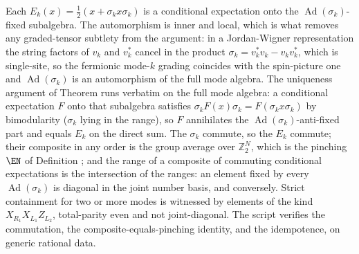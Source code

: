 Each $E_k(x) = \tfrac12(x + \sigma_k x \sigma_k)$ is a conditional expectation onto the $\operatorname{Ad}(\sigma_k)$-fixed subalgebra. The automorphism is inner and local, which is what removes any graded-tensor subtlety from the argument: in a Jordan-Wigner representation the string factors of $v_k$ and $v_k^{*}$ cancel in the product $\sigma_k = v_k^{*}v_k - v_k v_k^{*}$, which is single-site, so the fermionic mode-$k$ grading coincides with the spin-picture one and $\operatorname{Ad}(\sigma_k)$ is an automorphism of the full mode algebra. The uniqueness argument of Theorem  runs verbatim on the full mode algebra: a conditional expectation $F$ onto that subalgebra satisfies $\sigma_k F(x)\sigma_k = F(\sigma_k x \sigma_k)$ by bimodularity ($\sigma_k$ lying in the range), so $F$ annihilates the $\operatorname{Ad}(\sigma_k)$-anti-fixed part and equals $E_k$ on the direct sum. The $\sigma_k$ commute, so the $E_k$ commute; their composite in any order is the group average over $\mathbb{Z}_2^{N}$, which is the pinching $\EN$ of Definition ; and the range of a composite of commuting conditional expectations is the intersection of the ranges: an element fixed by every $\operatorname{Ad}(\sigma_k)$ is diagonal in the joint number basis, and conversely. Strict containment for two or more modes is witnessed by elements of the kind $X_{R_1}X_{L_1}Z_{L_2}$, total-parity even and not joint-diagonal. The script verifies the commutation, the composite-equals-pinching identity, and the idempotence, on generic rational data.
